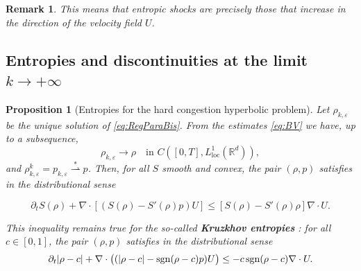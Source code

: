 \documentclass[11pt,twoside]{article}
\numberwithin{equation}{section}
\newcommand {\eps}  {\varepsilon}
\newcommand {\sgn} { {\rm sgn} }
\newcommand {\p}   {\partial}
\newtheorem{remark}[theorem]{Remark}
\newtheorem{proposition}[theorem]{Proposition}
\begin{document}
\begin{remark}
This means that entropic shocks are precisely those that \textit{increase} in the direction of the velocity field $U$.
\end{remark}

\subsection{Entropies and discontinuities at the limit $k \to + \infty$}

\begin{proposition}[Entropies for the hard congestion hyperbolic problem]
Let $\rho_{k,\eps}$ be the unique solution of \eqref{eq:RegParaBis}.  
From the estimates \eqref{eq:BV} we have, up to a subsequence,
\[
\rho_{k,\eps} \to \rho \quad \text{in } C([0,T],L^1_{\mathrm{loc}}(\mathbb{R}^d)),
\]
and $\rho_{k,\eps}^k=p_{k,\eps} \overset{*}{\rightharpoonup} p$.  
Then, for all $S$ smooth and convex, the pair $(\rho,p)$ satisfies in the distributional sense

\begin{equation}
\label{eq:entropy_limit_gen}
    \p_t S(\rho)+\nabla \cdot [(S(\rho)-S'(\rho)p)U]\le  [S(\rho)-S'(\rho)\rho]\nabla \cdot U.
\end{equation}

This inequality remains true for the so-called \textbf{Kruzkhov entropies} : for all $c\in[0,1]$, the pair $(\rho,p)$ satisfies in the distributional sense
\begin{equation}
\label{eq:entropy_lim_kruz}
\partial_t |\rho-c|
+ \nabla\cdot\big((|\rho-c|-\sgn(\rho-c)p)U\big)
\le -c\,\sgn(\rho-c)\nabla\cdot U .
\end{equation}
\end{proposition}
\end{document}
